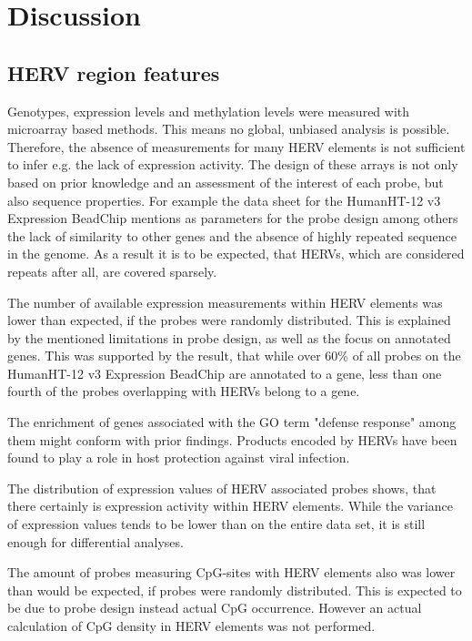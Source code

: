 \documentclass[a4paper,12pt,twoside,openright]{article}
\let\oldsection\section
\def\section{\cleardoublepage\oldsection}
\begin{document}
\newpage
\section{Discussion}
\label{Discussion}

\subsection{HERV region features}
\label{Discussion:HERV region features}

Genotypes, expression levels and methylation levels were measured with microarray based methods. This means no global, unbiased analysis is possible. Therefore, the absence of measurements for many HERV elements is not sufficient to infer e.g. the lack of expression activity. The design of these arrays is not only based on prior knowledge and an assessment of the interest of each probe, but also sequence properties. For example the data sheet for the HumanHT-12 v3 Expression BeadChip\cite{HumanHT} mentions as parameters for the probe design among others the lack of similarity to other genes and the absence of highly repeated sequence in the genome. As a result it is to be expected, that HERVs, which are considered repeats after all, are covered sparsely. 

The number of available expression measurements within HERV elements was lower than expected, if the probes were randomly distributed. This is explained by the mentioned limitations in probe design, as well as the focus on annotated genes. This was supported by the result, that while over 60\% of all probes on the HumanHT-12 v3 Expression BeadChip are annotated to a gene, less than one fourth of the probes overlapping with HERVs belong to a gene.

The enrichment of genes associated with the GO term "defense response" among them might conform with prior findings. Products encoded by HERVs have been found to play a role in host protection against viral infection\cite{Malfavon-Borja2015}.

The distribution of expression values of HERV associated probes shows, that there certainly is expression activity within HERV elements. While the variance of expression values tends to be lower than on the entire data set, it is still enough for differential analyses. 

The amount of probes measuring CpG-sites with HERV elements also was lower than would be expected, if probes were randomly distributed. This is expected to be due to probe design instead actual CpG occurrence. However an actual calculation of CpG density in HERV elements was not performed. 
\end{document}
